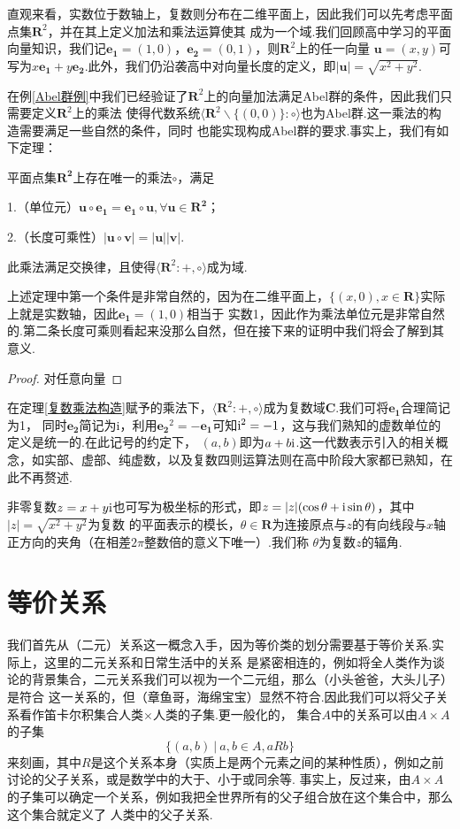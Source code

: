 直观来看，实数位于数轴上，复数则分布在二维平面上，因此我们可以先考虑平面点集$\mathbf{R}^2$，并在其上定义加法和乘法运算使其
成为一个域.我们回顾高中学习的平面向量知识，我们记$\bm{e_1}=(1,0)$，$\bm{e_2}=(0,1)$，则$\mathbf{R}^2$上的任一向量
$\bm{u}=(x,y)$可写为$x\bm{e_1}+y\bm{e_2}$.此外，我们仍沿袭高中对向量长度的定义，即$|\bm{u}|=\sqrt{x^2+y^2}$.

在例\ref{Abel群例}中我们已经验证了$\mathbf{R}^2$上的向量加法满足Abel群的条件，因此我们只需要定义$\mathbf{R}^2$上的乘法
使得代数系统$\langle\mathbf{R}^2\backslash\{(0,0)\}:\circ\rangle$也为Abel群.这一乘法的构造需要满足一些自然的条件，同时
也能实现构成Abel群的要求.事实上，我们有如下定理：
\begin{theorem}\label{复数乘法构造}
	平面点集$\mathbf{R^2}$上存在唯一的乘法$\circ$，满足

	1.（单位元）$\bm{u}\circ\bm{e_1}=\bm{e_1}\circ\bm{u},\forall\bm{u}\in\mathbf{R^2}$；

	2.（长度可乘性）$|\bm{u}\circ\bm{v}|=|\bm{u}||\bm{v}|$.

	此乘法满足交换律，且使得$\langle\mathbf{R}^2:+,\circ\rangle$成为域.
\end{theorem}

上述定理中第一个条件是非常自然的，因为在二维平面上，$\{(x,0),x\in\mathbf{R}\}$实际上就是实数轴，因此$\bm{e_1}=(1,0)$相当于
实数1，因此作为乘法单位元是非常自然的.第二条长度可乘则看起来没那么自然，但在接下来的证明中我们将会了解到其意义.

\begin{proof}
	对任意向量
\end{proof}

在定理\ref{复数乘法构造}赋予的乘法下，$\langle\mathbf{R}^2:+,\circ\rangle$成为复数域$\mathbf{C}$.我们可将$\bm{e_1}$合理简记为1，
同时$\bm{e_2}$简记为i，利用$\bm{e_2}^2=-\bm{e_1}$可知$\textup{i}^2=-1$，这与我们熟知的虚数单位的定义是统一的.在此记号的约定下，
$(a,b)$即为$a+b\textup{i}$.这一代数表示引入的相关概念，如实部、虚部、纯虚数，以及复数四则运算法则在高中阶段大家都已熟知，在此不再赘述.

非零复数$z=x+y\textup{i}$也可写为极坐标的形式，即$z=|z|(\cos\theta+\textup{i}\sin\theta)$，其中$|z|=\sqrt{x^2+y^2}$为复数
的平面表示的模长，$\theta\in\mathbf{R}$为连接原点与$z$的有向线段与$x$轴正方向的夹角（在相差$2\pi$整数倍的意义下唯一）.我们称
$\theta$为复数$z$的辐角.

\section{等价关系}
我们首先从（二元）关系这一概念入手，因为等价类的划分需要基于等价关系.实际上，这里的二元关系和日常生活中的关系
是紧密相连的，例如将全人类作为谈论的背景集合，二元关系我们可以视为一个二元组，那么（小头爸爸，大头儿子）是符合
这一关系的，但（章鱼哥，海绵宝宝）显然不符合.因此我们可以将父子关系看作笛卡尔积集合人类$\times$人类的子集.更一般化的，
集合$A$中的关系可以由$A\times A$的子集$$\{(a,b)\ |\ a,b\in A,aRb\}$$
来刻画，其中$R$是这个关系本身（实质上是两个元素之间的某种性质），例如之前讨论的父子关系，或是数学中的大于、小于或同余等.
事实上，反过来，由$A\times A$的子集可以确定一个关系，例如我把全世界所有的父子组合放在这个集合中，那么这个集合就定义了
人类中的父子关系.


